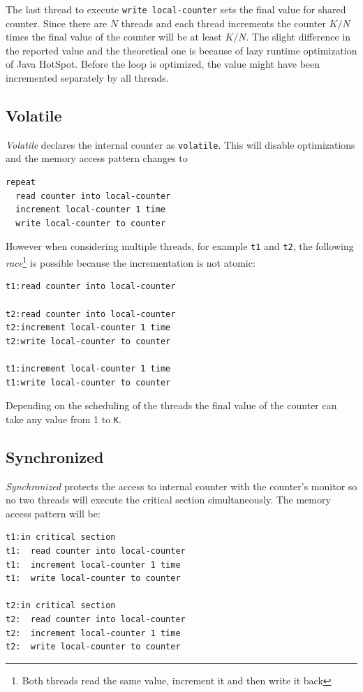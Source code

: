 \documentclass[12pt]{article}
\begin{document}
The last thread to execute \texttt{write local-counter} sets the final
value for shared counter. Since there are $N$ threads and each thread
increments the counter $K/N$ times the final value of the counter
will be at least $K/N$. The slight difference in the reported value
and the theoretical one is because of lazy runtime optimization of Java HotSpot.
Before the loop is optimized, the value might have been incremented separately
by all threads.

\subsection{Volatile}
\emph{Volatile} declares the internal counter as \texttt{volatile}.
This will disable optimizations and the memory access pattern changes to

\begin{verbatim}
repeat
  read counter into local-counter
  increment local-counter 1 time
  write local-counter to counter
\end{verbatim}

However when considering multiple threads, for example \texttt{t1} and
\texttt{t2}, the following \emph{race}\footnote{Both threads read the
same value, increment it and then write it back} is possible because
the incrementation is not atomic:

\begin{verbatim}
t1:read counter into local-counter

t2:read counter into local-counter
t2:increment local-counter 1 time
t2:write local-counter to counter

t1:increment local-counter 1 time
t1:write local-counter to counter
\end{verbatim}

Depending on the scheduling of the threads the final value of the counter can
take any value from 1 to \texttt{K}.

\subsection{Synchronized}

\emph{Synchronized} protects the access to internal counter with
the counter's monitor so no two threads will execute the critical
section simultaneously. The memory access pattern will be:

\begin{verbatim}
t1:in critical section
t1:  read counter into local-counter
t1:  increment local-counter 1 time
t1:  write local-counter to counter

t2:in critical section
t2:  read counter into local-counter
t2:  increment local-counter 1 time
t2:  write local-counter to counter
\end{verbatim}
\end{document}

